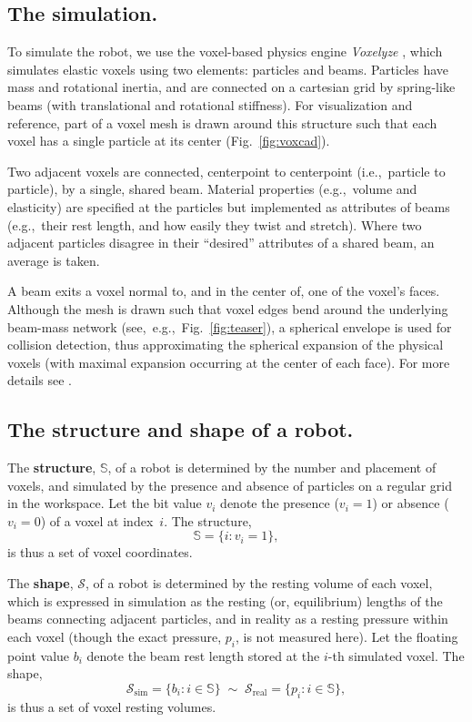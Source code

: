 \subsection{The simulation.}

To simulate the robot, we use the voxel-based physics engine \textit{Voxelyze} \cite{hiller2014dynamic},
which simulates elastic voxels using two elements: particles and beams.
Particles have mass and rotational inertia, and are connected on a cartesian grid by spring-like beams (with translational and rotational stiffness).
For visualization and reference, part of a voxel mesh is drawn around this structure such that each voxel has a single particle at its center (Fig.~\ref{fig:voxcad}).



Two adjacent voxels are connected, centerpoint to centerpoint (i.e.,~particle to particle), by a single, shared beam.
Material properties (e.g.,~volume and elasticity) are specified at the particles but implemented as attributes of beams (e.g.,~their rest length, and how easily they twist and stretch).
Where two adjacent particles disagree in their ``desired'' attributes of a shared beam, an average is taken.

A beam exits a voxel normal to, and in the center of, one of the voxel's faces.
Although the mesh is drawn such that voxel edges bend around the underlying beam-mass network (see,~e.g.,~Fig.~\ref{fig:teaser}), a spherical envelope is used for collision detection, thus approximating the spherical expansion of the physical voxels (with maximal expansion occurring at the center of each face).
For more details see \cite{hiller2014dynamic}.


\subsection{The structure and shape of a robot.}

The \textbf{structure}, $\mathbb{S}$,
of a robot is determined by the number and placement of voxels, and simulated by the presence and absence of particles on a regular grid in the workspace.
Let the bit value $v_i$ denote the presence ($v_i=1$) or absence ($v_i=0$) of a voxel at index~$i$.
The structure,
\begin{equation}
    \label{eq:structure}
    \mathbb{S} = \{i : v_i = 1 \} ,
\end{equation}
is thus a set of voxel coordinates.

The \textbf{shape}, $\mathcal{S}$,
of a robot is determined by the resting volume of each voxel, which is expressed in simulation as the resting (or, equilibrium) lengths of the beams connecting adjacent particles, and in reality as a resting pressure within each voxel (though the exact pressure, $p_i$, is not measured here).
Let the floating point value $b_i$ denote the beam rest length stored at the $i$-th simulated voxel.
The shape,
\begin{equation}
    \label{eq:shape}
    \mathcal{S}_{\text{sim}} = \{b_i : i \in \mathbb{S} \} \; \sim \; \mathcal{S}_{\text{real}} = \{p_i : i \in \mathbb{S} \} ,
\end{equation}
is thus a set of voxel resting volumes.

